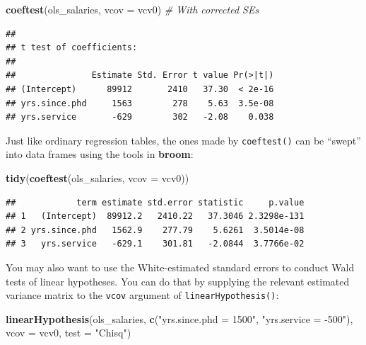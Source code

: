 \documentclass[12pt,oneside,openany]{book}
\newenvironment{Shaded}{\begin{snugshade}}{\end{snugshade}}
\newcommand{\KeywordTok}[1]{\textcolor[rgb]{0.13,0.29,0.53}{\textbf{{#1}}}}
\newcommand{\DataTypeTok}[1]{\textcolor[rgb]{0.13,0.29,0.53}{{#1}}}
\newcommand{\StringTok}[1]{\textcolor[rgb]{0.31,0.60,0.02}{{#1}}}
\newcommand{\CommentTok}[1]{\textcolor[rgb]{0.56,0.35,0.01}{\textit{{#1}}}}
\newcommand{\NormalTok}[1]{{#1}}
\begin{document}
\begin{Shaded}
\begin{Highlighting}[]
\KeywordTok{coeftest}\NormalTok{(ols_salaries, }\DataTypeTok{vcov =} \NormalTok{vcv0)  }\CommentTok{# With corrected SEs}
\end{Highlighting}
\end{Shaded}

\begin{verbatim}
## 
## t test of coefficients:
## 
##               Estimate Std. Error t value Pr(>|t|)
## (Intercept)      89912       2410   37.30  < 2e-16
## yrs.since.phd     1563        278    5.63  3.5e-08
## yrs.service       -629        302   -2.08    0.038
\end{verbatim}

Just like ordinary regression tables, the ones made by
\texttt{coeftest()} can be ``swept'' into data frames using the tools in
\textbf{broom}:

\begin{Shaded}
\begin{Highlighting}[]
\KeywordTok{tidy}\NormalTok{(}\KeywordTok{coeftest}\NormalTok{(ols_salaries, }\DataTypeTok{vcov =} \NormalTok{vcv0))}
\end{Highlighting}
\end{Shaded}

\begin{verbatim}
##            term estimate std.error statistic     p.value
## 1   (Intercept)  89912.2   2410.22   37.3046 2.3298e-131
## 2 yrs.since.phd   1562.9    277.79    5.6261  3.5014e-08
## 3   yrs.service   -629.1    301.81   -2.0844  3.7766e-02
\end{verbatim}

You may also want to use the White-estimated standard errors to conduct
Wald tests of linear hypotheses. You can do that by supplying the
relevant estimated variance matrix to the \texttt{vcov} argument of
\texttt{linearHypothesis()}:

\begin{Shaded}
\begin{Highlighting}[]
\KeywordTok{linearHypothesis}\NormalTok{(ols_salaries,}
                 \KeywordTok{c}\NormalTok{(}\StringTok{"yrs.since.phd = 1500"}\NormalTok{, }\StringTok{"yrs.service = -500"}\NormalTok{),}
                 \DataTypeTok{vcov =} \NormalTok{vcv0,}
                 \DataTypeTok{test =} \StringTok{"Chisq"}\NormalTok{)}
\end{Highlighting}
\end{Shaded}
\end{document}
